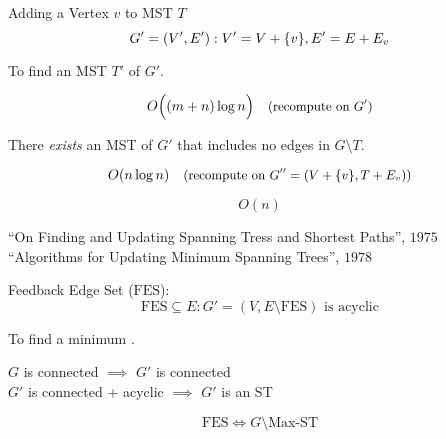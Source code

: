 
\begin{frame}{}
  \centerline{}
\end{frame}

\begin{frame}{}
  \begin{exampleblock}{Adding a Vertex $v$ to MST $T$ }
    \[
      G' = (V',E'): V' = V + \{v\}, E' = E + E_v
    \]

    \centerline{To find an MST $T'$ of $G'$.}
  \end{exampleblock}

  \pause
  \[
    O\Big((m+n) \log n\Big) \quad \text{\small (recompute on $G'$)}
  \]

  \pause
  \begin{theorem}
    \centerline{There \emph{exists} an MST of $G'$ that includes no edges in $G \setminus T$.}
  \end{theorem}
  \pause
  \[
    O(n \log n) \quad \text{\small (recompute on $G'' = (V + \{v\}, T + E_v)$)}
  \]


  \pause
  \[
    O(n)
  \]

  \pause
  \vspace{-0.30cm}
  \begin{center}
    ``On Finding and Updating Spanning Tress and Shortest Paths'', $1975$ \\
    ``Algorithms for Updating Minimum Spanning Trees'', $1978$
  \end{center}
\end{frame}

\begin{frame}{}
  \begin{exampleblock}{Feedback Edge Set ($\text{FES}$): }
    \[
      \text{FES} \subseteq E: G' = (V, E \setminus \text{FES}) \text{ is acyclic}
    \]

    \centerline{To find a minimum .}
  \end{exampleblock}

  \pause
  \vspace{0.50cm}
  \begin{center}
    $G$ is connected $\implies$ $G'$ is connected \\[8pt]
    $G'$ is connected + acyclic $\implies$ $G'$ is an ST \\[8pt]
  \end{center}

  \pause
  \[
    \text{FES} \iff G \setminus \text{Max-ST}
  \]
\end{frame}

